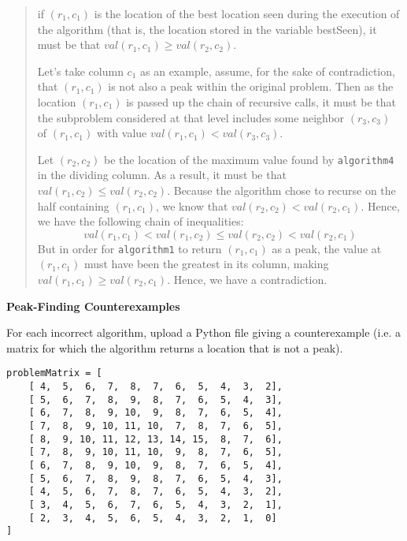 \documentclass[12pt,twoside]{article}
\begin{document}
\begin{problems}
\ifsolution \reason{}
\begin{quote}
    if $(r_1, c_1)$ is the location of the best location seen 
    during the execution of the algorithm 
    (that is, the location stored in the variable bestSeen), 
    it must be that $val(r_1, c_1) \ge val(r_2, c_2)$.

    Let's take column $c_1$ as an example, 
    assume, for the sake of contradiction,
    that $(r_1, c_1)$ is not also a peak within the original problem.
    Then as the location $(r_1, c_1)$ is passed up the chain of recursive calls,
    it must be that the subproblem considered at that level includes 
    some neighbor $(r_3, c_3)$ of $(r_1, c_1)$ with value
    $val(r_1, c_1) < val(r_3, c_3)$.
    
    Let $(r_2, c_2)$ be
    the location of the maximum value found by \texttt{algorithm4}
    in the dividing column.
    As a result, it must be that $val(r_1, c_2) \le val(r_2, c_2)$.
    Because the algorithm chose to recurse
    on the half containing $(r_1, c_1)$,
    we know that $val(r_2, c_2) < val(r_2, c_1)$.
    Hence, we have the following chain of inequalities:
    $$val(r_1, c_1) < val(r_1, c_2) \le val(r_2, c_2) < val(r_2, c_1)$$
    But in order for \texttt{algorithm1} to return $(r_1, c_1)$ as a peak,
    the value at $(r_1, c_1)$ must have been the greatest in its column,
    making $val(r_1, c_1) \ge val(r_2, c_1)$.
    Hence, we have a contradiction.
\end{quote}
\fi

\problem {} \textbf{Peak-Finding Counterexamples}

For each incorrect algorithm,
upload a Python file giving a counterexample
(i.e. a matrix for which the algorithm returns a location
that is not a peak).

\ifsolution \solution{}
\begin{verbatim}
problemMatrix = [
    [ 4,  5,  6,  7,  8,  7,  6,  5,  4,  3,  2],
    [ 5,  6,  7,  8,  9,  8,  7,  6,  5,  4,  3],
    [ 6,  7,  8,  9, 10,  9,  8,  7,  6,  5,  4],
    [ 7,  8,  9, 10, 11, 10,  7,  8,  7,  6,  5],
    [ 8,  9, 10, 11, 12, 13, 14, 15,  8,  7,  6],
    [ 7,  8,  9, 10, 11, 10,  9,  8,  7,  6,  5],
    [ 6,  7,  8,  9, 10,  9,  8,  7,  6,  5,  4],
    [ 5,  6,  7,  8,  9,  8,  7,  6,  5,  4,  3],
    [ 4,  5,  6,  7,  8,  7,  6,  5,  4,  3,  2],
    [ 3,  4,  5,  6,  7,  6,  5,  4,  3,  2,  1],
    [ 2,  3,  4,  5,  6,  5,  4,  3,  2,  1,  0]
]

\end{verbatim}
\fi

\end{problems}
\end{document}
